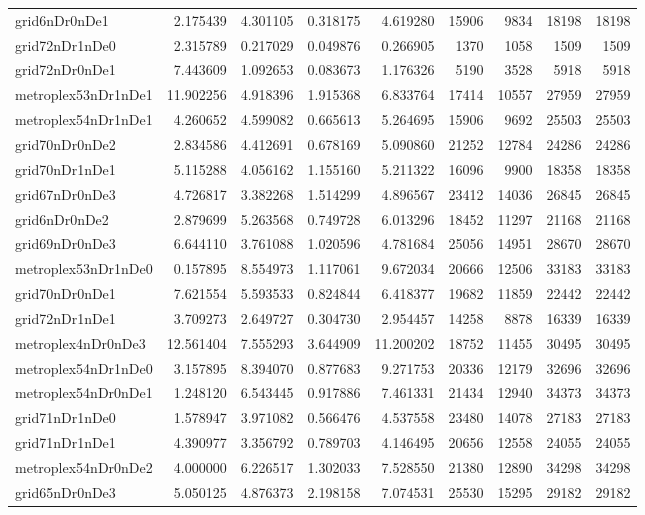 \begin{longtable}{|l|r|r|r|r|r|r|r|r|}
grid6nDr0nDe1 & 2.175439 & 4.301105 & 0.318175 & 4.619280 & 15906 & 9834 & 18198 & 18198 \\
grid72nDr1nDe0 & 2.315789 & 0.217029 & 0.049876 & 0.266905 & 1370 & 1058 & 1509 & 1509 \\
grid72nDr0nDe1 & 7.443609 & 1.092653 & 0.083673 & 1.176326 & 5190 & 3528 & 5918 & 5918 \\
metroplex53nDr1nDe1 & 11.902256 & 4.918396 & 1.915368 & 6.833764 & 17414 & 10557 & 27959 & 27959 \\
metroplex54nDr1nDe1 & 4.260652 & 4.599082 & 0.665613 & 5.264695 & 15906 & 9692 & 25503 & 25503 \\
grid70nDr0nDe2 & 2.834586 & 4.412691 & 0.678169 & 5.090860 & 21252 & 12784 & 24286 & 24286 \\
grid70nDr1nDe1 & 5.115288 & 4.056162 & 1.155160 & 5.211322 & 16096 & 9900 & 18358 & 18358 \\
grid67nDr0nDe3 & 4.726817 & 3.382268 & 1.514299 & 4.896567 & 23412 & 14036 & 26845 & 26845 \\
grid6nDr0nDe2 & 2.879699 & 5.263568 & 0.749728 & 6.013296 & 18452 & 11297 & 21168 & 21168 \\
grid69nDr0nDe3 & 6.644110 & 3.761088 & 1.020596 & 4.781684 & 25056 & 14951 & 28670 & 28670 \\
metroplex53nDr1nDe0 & 0.157895 & 8.554973 & 1.117061 & 9.672034 & 20666 & 12506 & 33183 & 33183 \\
grid70nDr0nDe1 & 7.621554 & 5.593533 & 0.824844 & 6.418377 & 19682 & 11859 & 22442 & 22442 \\
grid72nDr1nDe1 & 3.709273 & 2.649727 & 0.304730 & 2.954457 & 14258 & 8878 & 16339 & 16339 \\
metroplex4nDr0nDe3 & 12.561404 & 7.555293 & 3.644909 & 11.200202 & 18752 & 11455 & 30495 & 30495 \\
metroplex54nDr1nDe0 & 3.157895 & 8.394070 & 0.877683 & 9.271753 & 20336 & 12179 & 32696 & 32696 \\
metroplex54nDr0nDe1 & 1.248120 & 6.543445 & 0.917886 & 7.461331 & 21434 & 12940 & 34373 & 34373 \\
grid71nDr1nDe0 & 1.578947 & 3.971082 & 0.566476 & 4.537558 & 23480 & 14078 & 27183 & 27183 \\
grid71nDr1nDe1 & 4.390977 & 3.356792 & 0.789703 & 4.146495 & 20656 & 12558 & 24055 & 24055 \\
metroplex54nDr0nDe2 & 4.000000 & 6.226517 & 1.302033 & 7.528550 & 21380 & 12890 & 34298 & 34298 \\
grid65nDr0nDe3 & 5.050125 & 4.876373 & 2.198158 & 7.074531 & 25530 & 15295 & 29182 & 29182 \\

\end{longtable}
